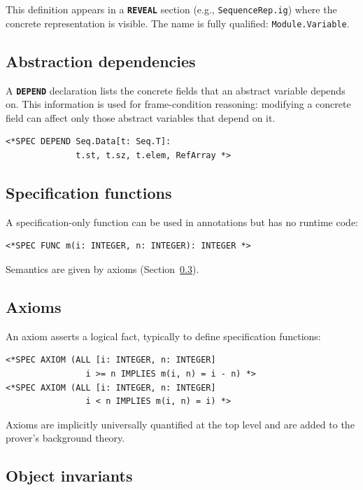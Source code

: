 \documentclass[11pt]{article}
\newcommand{\m}[1]{\texttt{#1}}
\newcommand{\kw}[1]{\texttt{\textbf{#1}}}
\begin{document}
This definition appears in a \kw{REVEAL} section (e.g.,
\m{SequenceRep.ig}) where the concrete representation is visible.
The name is fully qualified: \m{Module.Variable}.

\subsection{Abstraction dependencies}

A \kw{DEPEND} declaration lists the concrete fields that an abstract
variable depends on.  This information is used for frame-condition
reasoning: modifying a concrete field can affect only those abstract
variables that depend on it.

\begin{lstlisting}[language=ESC]
<*SPEC DEPEND Seq.Data[t: Seq.T]:
              t.st, t.sz, t.elem, RefArray *>
\end{lstlisting}

\subsection{Specification functions}

A specification-only function can be used in annotations but has no
runtime code:

\begin{lstlisting}[language=ESC]
<*SPEC FUNC m(i: INTEGER, n: INTEGER): INTEGER *>
\end{lstlisting}

Semantics are given by axioms (Section~\ref{sec:axioms}).

\subsection{Axioms}
\label{sec:axioms}

An axiom asserts a logical fact, typically to define specification
functions:

\begin{lstlisting}[language=ESC]
<*SPEC AXIOM (ALL [i: INTEGER, n: INTEGER]
                i >= n IMPLIES m(i, n) = i - n) *>
<*SPEC AXIOM (ALL [i: INTEGER, n: INTEGER]
                i < n IMPLIES m(i, n) = i) *>
\end{lstlisting}

Axioms are implicitly universally quantified at the top level and are
added to the prover's background theory.

\subsection{Object invariants}
\end{document}
